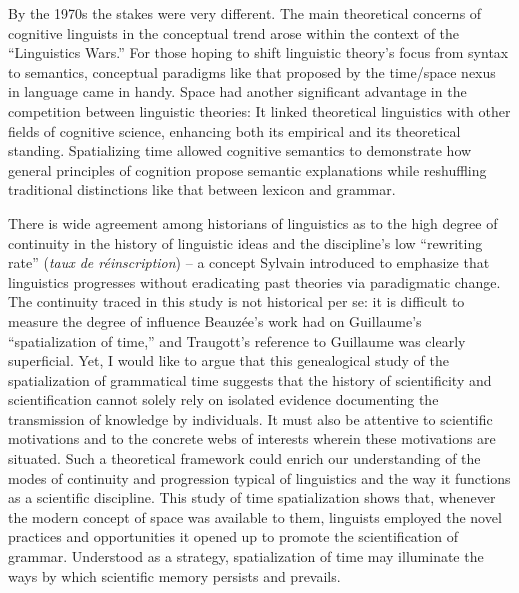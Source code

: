 \documentclass[english,output=paper,colorlinks,citecolor=brown]{../langscibook}
\begin{document}
By the 1970s the stakes were very different. The main theoretical concerns of cognitive linguists in the conceptual trend arose within the context of the “Linguistics Wars.” For those hoping to shift linguistic theory’s focus from syntax to semantics, conceptual paradigms like that proposed by the time/space nexus in language came in handy. Space had another significant advantage in the competition between linguistic theories: It linked theoretical linguistics with other fields of cognitive science, enhancing both its empirical and its theoretical standing. Spatializing time allowed cognitive semantics to demonstrate how general principles of cognition propose semantic explanations while reshuffling traditional distinctions like that between lexicon and grammar. 

There is wide agreement among historians of linguistics as to the high degree of continuity in the history of linguistic ideas and the discipline’s low “rewriting rate” (\textit{taux de réinscription}) -- a concept Sylvain \citet{Auroux1980} introduced to emphasize that linguistics progresses without eradicating past theories via paradigmatic change. The continuity traced in this study is not historical per se: it is difficult to measure the degree of influence Beauzée’s work had on Guillaume’s “spatialization of time,” and Traugott’s reference to Guillaume was clearly superficial. Yet, I would like to argue that this genealogical study of the spatialization of grammatical time suggests that the history of scientificity \citep{Auroux1990} and scientification cannot solely rely on isolated evidence documenting the transmission of knowledge by individuals. It must also be attentive to scientific motivations and to the concrete webs of interests wherein these motivations are situated. Such a theoretical framework could enrich our understanding of the modes of continuity and progression typical of linguistics and the way it functions as a scientific discipline. This study of time spatialization shows that, whenever the modern concept of space was available to them, linguists employed the novel practices and opportunities it opened up to promote the scientification of grammar. Understood as a strategy, spatialization of time may illuminate the ways by which scientific memory persists and prevails.


{\sloppy\printbibliography[heading=subbibliography,notkeyword=this]}
\end{document}
